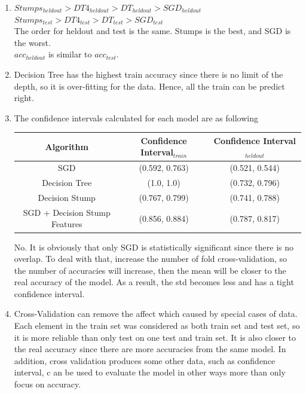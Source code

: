 \documentclass{article}
\begin{document}
\begin{enumerate}
\begin{enumerate}
            \begin{enumerate}[1.]
                \item $Stumps_{heldout} > DT4_{heldout} > DT_{heldout} > SGD_{heldout}$\\
                		$Stumps_{test} > DT4_{test} > DT_{test} > SGD_{test}$\\
			The order for heldout and test is the same. Stumps is the best, and SGD is the worst.\\
			$acc_{heldout}$ is similar to $acc_{test}$.\\
                \item Decision Tree has the highest train accuracy since there is no limit of the depth, so it is over-fitting for the data. Hence, all the train can be predict right.
                \item 
		The confidence intervals calculated for each model are as following
		\begin{center}
                \begin{tabular}{|c|c|c|}
                    \hline Algorithm &Confidence Interval$_{train}$ & Confidence Interval$_{heldout}$ \\
                    \hline SGD & (0.592, 0.763) & (0.521, 0.544) \\
                    Decision Tree & (1.0, 1.0) & (0.732, 0.796) \\
                    Decision Stump & (0.767, 0.799) & (0.741, 0.788) \\
                    SGD + Decision Stump Features & (0.856, 0.884) & (0.787, 0.817) \\ \hline
                \end{tabular}
            \end{center}
            No. It is obviously that only SGD is statistically significant since there is no overlap. To deal with that, increase the number of fold cross-validation, so the number of accuracies will increase, 
            then the mean will be closer to the real accuracy of the model. As a result, the std becomes less and has a tight confidence interval.
                \item
                Cross-Validation can remove the affect which caused by special cases of data. Each element in the train set was considered as both train set and test set, 
                so it is more reliable than only test on one test and train set. It is also closer to the real accuracy since there are more accuracies from the same model.  In addition, cross validation produces some other data, such as confidence interval, c
                an be used to evaluate the model in other ways more than only focus on accuracy.
            \end{enumerate}


\end{enumerate}
\end{enumerate}
\end{document}
